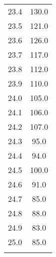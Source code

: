\begin{table}
\begin{tabular}{S[table-format=1.1] S[table-format=4.1]}
    23.4&	130.0\\
    23.5&	121.0\\
    23.6&	126.0\\
    23.7&	117.0\\
    23.8&	112.0\\
    23.9&	110.0\\
    24.0&	105.0\\
    24.1&	106.0\\
    24.2&	107.0\\
    24.3&	95.0\\
    24.4&	94.0\\
    24.5&	100.0\\
    24.6&	91.0\\
    24.7&	85.0\\
    24.8&	88.0\\
    24.9&	83.0\\
    25.0&	85.0\\
    &\\
        \bottomrule
    \end{tabular}
\end{table}

